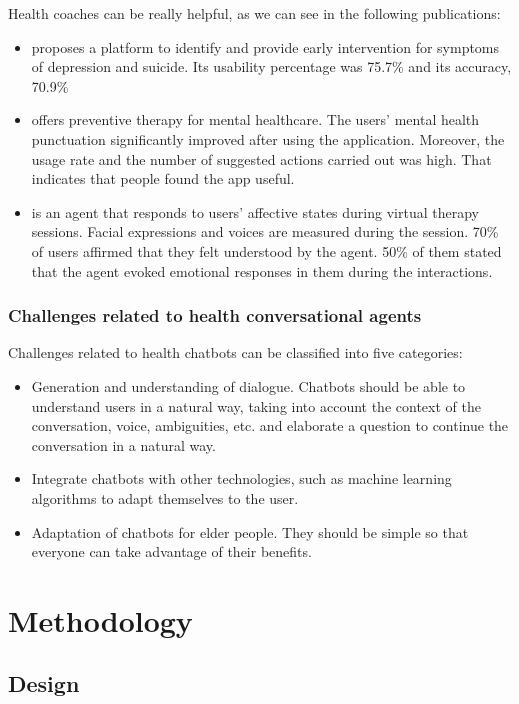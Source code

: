 \documentclass[12pt,english]{article}
\begin{document}
Health coaches can be really helpful, as we can see in the following publications:

\begin{itemize}
  \item \cite{Breso2016297} proposes a platform to identify and provide early intervention for symptoms of depression and suicide. Its usability percentage was 75.7\% and its accuracy, 70.9\%
  \item \cite{Hirano2017} offers preventive therapy for mental healthcare. The users' mental health punctuation significantly improved after using the application. Moreover, the usage rate and the number of suggested actions carried out was high. That indicates that people found the app useful.
  \item \cite{Ring2016} is an agent that responds to users' affective states during virtual therapy sessions. Facial expressions and voices are measured during the session. 70\% of users affirmed that they felt understood by the agent. 50\% of them stated that the agent evoked emotional responses in them during the interactions.
\end{itemize}

\subsubsection{Challenges related to health conversational agents}

Challenges related to health chatbots can be classified into five categories:
\begin{itemize}
  \item Generation and understanding of dialogue. Chatbots should be able to understand users in a natural way, taking into account the context of the conversation, voice, ambiguities, etc. and elaborate a question to continue the conversation in a natural way.
  \item Integrate chatbots with other technologies, such as machine learning algorithms to adapt themselves to the user.
  \item Adaptation of chatbots for elder people. They should be simple so that everyone can take advantage of their benefits.
\end{itemize}

\section{Methodology}

\subsection{Design}
\end{document}
